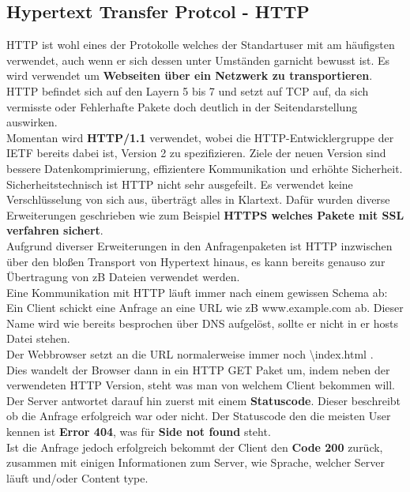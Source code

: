 \documentclass[12pt,a4paper]{report}
\begin{document}
\subsection{Hypertext Transfer Protcol - HTTP}
HTTP ist wohl eines der Protokolle welches der Standartuser mit am häufigsten verwendet, auch wenn er sich dessen unter Umständen garnicht bewusst ist. Es wird verwendet um \textbf{Webseiten über ein Netzwerk zu transportieren}. HTTP befindet sich auf den Layern 5 bis 7 und setzt auf TCP auf, da sich vermisste oder Fehlerhafte Pakete doch deutlich in der Seitendarstellung auswirken.\\
Momentan wird \textbf{HTTP/1.1} verwendet, wobei die HTTP-Entwicklergruppe der IETF bereits dabei ist, Version 2 zu spezifizieren. Ziele der neuen Version sind bessere Datenkomprimierung, effizientere Kommunikation und erhöhte Sicherheit.\\

Sicherheitstechnisch ist HTTP nicht sehr ausgefeilt. Es verwendet keine Verschlüsselung von sich aus, überträgt alles in Klartext. Dafür wurden diverse Erweiterungen geschrieben wie zum Beispiel \textbf{HTTPS welches Pakete mit SSL verfahren sichert}.\\

Aufgrund diverser Erweiterungen in den Anfragenpaketen ist HTTP inzwischen über den bloßen Transport von Hypertext hinaus, es kann bereits genauso zur Übertragung von zB Dateien verwendet werden.\\

Eine Kommunikation mit HTTP läuft immer nach einem gewissen Schema ab:\\
Ein Client schickt eine Anfrage an eine URL wie zB www.example.com ab. Dieser Name wird wie bereits besprochen über DNS aufgelöst, sollte er nicht in er hosts Datei stehen.\\
Der Webbrowser setzt an die URL normalerweise immer noch \glqq \textbackslash index.html \grqq .\\
Dies wandelt der Browser dann in ein HTTP GET Paket um, indem neben der verwendeten HTTP Version, steht was man von welchem Client bekommen will.\\
Der Server antwortet darauf hin zuerst mit einem \textbf{Statuscode}. Dieser beschreibt ob die Anfrage erfolgreich war oder nicht. Der Statuscode den die meisten User kennen ist \textbf{Error 404}, was für \textbf{Side not found} steht.\\
Ist die Anfrage jedoch erfolgreich bekommt der Client den \textbf{Code 200} zurück, zusammen mit einigen Informationen zum Server, wie Sprache, welcher Server läuft und/oder Content type.
\end{document}

